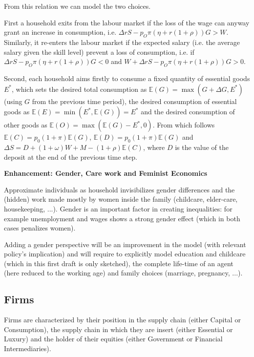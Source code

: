 \documentclass[a4paper, headings=standardclasses]{scrartcl}
\newenvironment{enh}[1][]{\begin{framed}\noindent\textbf{Enhancement: #1}\par}{\end{framed}}
\begin{document}
From this relation we can model the two choices.

First a household exits from the labour market if the loss of the wage can anyway grant an increase in consumption, i.e. $\Delta r S - p_O \pi (\eta + r (1+\rho)) G > W$. Similarly, it re-enters the labour market if the expected salary (i.e. the average salary given the skill level) prevent a loss of consumption, i.e. if $\Delta r S - p_O \pi (\eta + r (1+\rho)) G < 0$ and $W + \Delta r S - p_O \pi (\eta + r (1+\rho)) G > 0$.

Second, each household aims firstly to consume a fixed quantity of essential goods $E^*$, which sets the desired total consumption as $\mathbb{E}(G) = \max(G + \Delta G, E^*)$ (using $G$ from the previous time period), the desired consumption of essential goods as $\mathbb{E}(E) = \min(E^*, \mathbb{E}(G)) = E^*$ and the desired consumption of other goods as $\mathbb{E}(O) = \max(\mathbb{E}(G) - E^*, 0)$. From which follows $\mathbb{E}(C) = p_0 (1+\pi) \mathbb{E}(G)$, $\mathbb{E}(D) = p_0 (1+\pi) \mathbb{E}(G)$ and $\Delta S = D + (1+\omega) W + M - (1+\rho) \mathbb{E}(C)$, where $D$ is the value of the deposit at the end of the previous time step.

\begin{enh}[Gender, Care work and Feminist Economics]
	Approximate individuals as household invisibilizes gender differences and the (hidden) work made mostly by women inside the family (childcare, elder-care, housekeeping, ...).
	Gender is an important factor in creating inequalities: for example unemployment and wages shows a strong gender effect (which in both cases penalizes women).

	Adding a gender perspective will be an improvement in the model (with relevant policy's implication) and will require to explicitly model education and childcare (which in this first draft is only sketched), the complete life-time of an agent (here reduced to the working age) and family choices (marriage, pregnancy, ...).
\end{enh}

\subsection{Firms}
Firms are characterized by their position in the supply chain (either Capital or Consumption), the supply chain in which they are insert (either Essential or Luxury) and the holder of their equities (either Government or Financial Intermediaries).
\end{document}
